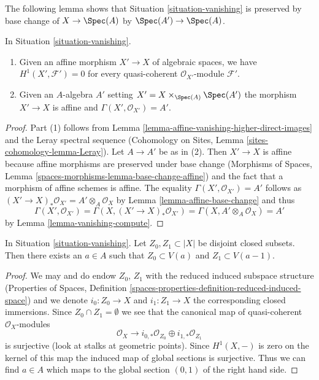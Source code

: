 \noindent
The following lemma shows that Situation \ref{situation-vanishing}
is preserved by base change of $X \to \Spec(A)$ by $\Spec(A') \to \Spec(A)$.

\begin{lemma}
\label{lemma-vanishing-base-change}
In Situation \ref{situation-vanishing}.
\begin{enumerate}
\item Given an affine morphism $X' \to X$ of algebraic spaces, we have
$H^1(X', \mathcal{F}') = 0$ for every quasi-coherent
$\mathcal{O}_{X'}$-module $\mathcal{F}'$.
\item Given an $A$-algebra $A'$ setting $X' = X \times_{\Spec(A)} \Spec(A')$
the morphism $X' \to X$ is affine and $\Gamma(X', \mathcal{O}_{X'}) = A'$.
\end{enumerate}
\end{lemma}

\begin{proof}
Part (1) follows from Lemma \ref{lemma-affine-vanishing-higher-direct-images}
and the Leray spectral sequence (Cohomology on Sites, Lemma
\ref{sites-cohomology-lemma-Leray}). Let $A \to A'$ be as in (2).
Then $X' \to X$ is affine because affine morphisms are preserved under
base change (Morphisms of Spaces, Lemma
\ref{spaces-morphisms-lemma-base-change-affine}) and the
fact that a morphism of affine schemes is affine. The equality
$\Gamma(X', \mathcal{O}_{X'}) = A'$ follows as
$(X' \to X)_*\mathcal{O}_{X'} = A' \otimes_A \mathcal{O}_X$
by Lemma \ref{lemma-affine-base-change} and thus
$$
\Gamma(X', \mathcal{O}_{X'}) =
\Gamma(X, (X' \to X)_*\mathcal{O}_{X'}) =
\Gamma(X, A' \otimes_A \mathcal{O}_X) = A'
$$
by Lemma \ref{lemma-vanishing-compute}.
\end{proof}

\begin{lemma}
\label{lemma-vanishing-separate-closed}
In Situation \ref{situation-vanishing}. Let $Z_0, Z_1 \subset |X|$
be disjoint closed subsets. Then there exists an $a \in A$ such that
$Z_0 \subset V(a)$ and $Z_1 \subset V(a - 1)$.
\end{lemma}

\begin{proof}
We may and do endow $Z_0$, $Z_1$ with the reduced induced subspace structure
(Properties of Spaces, Definition
\ref{spaces-properties-definition-reduced-induced-space}) and we denote
$i_0 : Z_0 \to X$ and $i_1 : Z_1 \to X$ the corresponding closed immersions.
Since $Z_0 \cap Z_1 = \emptyset$ we see that the canonical map of
quasi-coherent $\mathcal{O}_X$-modules
$$
\mathcal{O}_X
\longrightarrow
i_{0, *}\mathcal{O}_{Z_0} \oplus i_{1, *}\mathcal{O}_{Z_1}
$$
is surjective (look at stalks at geometric points). Since $H^1(X, -)$ is
zero on the kernel of this map the induced map of global sections is
surjective. Thus we can find $a \in A$ which maps to the global section
$(0, 1)$ of the right hand side.
\end{proof}

